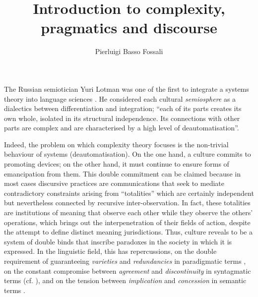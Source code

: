 \documentclass[output=paper]{langscibook}
\author{Pierluigi {Basso Fossali}\affiliation{UMR 5161 ICAR; Centre National de la Recherche Scientifique; Ecole Normale Supérieure; Université Lumière Lyon 2}}
\title{Introduction to complexity, pragmatics and discourse}
\begin{document}
\maketitle 


The Russian semiotician Yuri Lotman was one of the first to integrate a systems theory into language sciences \citep[215]{Lotman2005}. He considered each cultural \textit{semiosphere} as a dialectics between differentiation and integration; “each of its parts creates its own whole, isolated in its structural independence. Its connections with other parts are complex and are characterised by a high level of deautomatisation”.

Indeed, the problem on which complexity theory focuses is the non-trivial behaviour of systems (deautomatisation). On the one hand, a culture commits to promoting devices; on the other hand, it must continue to ensure forms of emancipation from them. This double commitment can be claimed because in most cases discursive practices are communications that seek to mediate contradictory constraints arising from “totalities” which are certainly independent but nevertheless connected by recursive inter-observation. In fact, these totalities are institutions of meaning that observe each other while they observe the others' operations, which brings out the interpenetration of their fields of action, despite the attempt to define distinct meaning jurisdictions. Thus, culture reveals to be a system of double binds that inscribe paradoxes in the society in which it is expressed. In the linguistic field, this has repercussions, on the double requirement of guaranteeing \textit{varieties} and \textit{redundancies} in paradigmatic terms \citep{Atlan1972}, on the constant compromise between \textit{agreement} and \textit{discontinuity} in syntagmatic terms (cf. \citealt{Harris1945,Missire2010}), and on the tension between \textit{implication} and \textit{concession} in semantic terms \citep{Zilberberg2012}.
\end{document}
